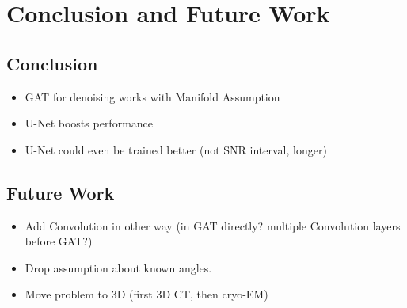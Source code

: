 \chapter{Conclusion and Future Work}
\label{sec:Conclusion}

\section{Conclusion}

\begin{itemize}
  \item GAT for denoising works with Manifold Assumption
  \item U-Net boosts performance
  \item U-Net could even be trained better (not SNR interval, longer)
\end{itemize}

\section{Future Work}
\begin{itemize}
  \item Add Convolution in other way (in GAT directly? multiple Convolution layers before GAT?)
  \item Drop assumption about known angles.
  \item Move problem to 3D (first 3D CT, then cryo-EM)
\end{itemize}